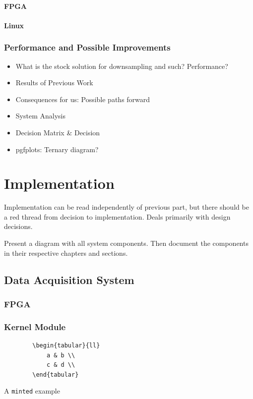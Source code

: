 \documentclass[a4paper,oneside]{alpenthesis/alpenthesis}
\begin{document}
\subsection{FPGA}
\subsection{Linux}

\section{Performance and Possible Improvements}
\begin{itemize}
    \item
    What is the stock solution for downsampling and such? Performance?
    \item
    Results of Previous Work
    \item
    Consequences for us: Possible paths forward
    \item
    System Analysis
    \item 
    Decision Matrix \& Decision
    \item
    pgfplots: Ternary diagram?
\end{itemize}



\part{Implementation} %
\label{part:Implementation}
Implementation can be read independently of previous part, but there should be
a  red thread  from decision  to implementation. Deals  primarily with  design
decisions.

Present a diagram with all  system components. Then document the components in
their respective chapters and sections.

\chapter{Data Acquisition System}
\label{ch:data_acquisition_system}
\section{FPGA}
\section{Kernel Module}
\begin{listing}
    \begin{verbatim}
        \begin{tabular}{ll}
            a & b \\
            c & d \\
        \end{tabular}
    \end{verbatim}
    \caption{A \texttt{minted} example}
    \label{lst:minted-example}
\end{listing}
\end{document}

